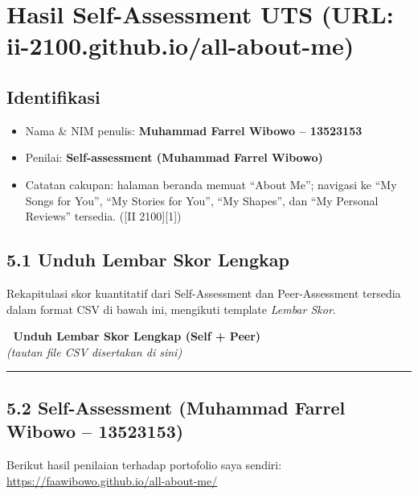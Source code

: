 \documentclass[
  letterpaper,
  DIV=11,
  numbers=noendperiod]{scrreprt}
\providecommand{\tightlist}{%
  \setlength{\itemsep}{0pt}\setlength{\parskip}{0pt}}
\begin{document}

\chapter{Hasil Self-Assessment UTS (URL:
ii-2100.github.io/all-about-me)}\label{hasil-self-assessment-uts-url-ii-2100.github.ioall-about-me}

\section{Identifikasi}\label{identifikasi}

\begin{itemize}
\tightlist
\item
  Nama \& NIM penulis: \textbf{Muhammad Farrel Wibowo -- 13523153}
\item
  Penilai: \textbf{Self-assessment (Muhammad Farrel Wibowo)}
\item
  Catatan cakupan: halaman beranda memuat ``About Me''; navigasi ke ``My
  Songs for You'', ``My Stories for You'', ``My Shapes'', dan ``My
  Personal Reviews'' tersedia. ({[}II 2100{]}{[}1{]})
\end{itemize}

\section{5.1 Unduh Lembar Skor Lengkap}\label{unduh-lembar-skor-lengkap}

Rekapitulasi skor kuantitatif dari Self-Assessment dan Peer-Assessment
tersedia dalam format CSV di bawah ini, mengikuti template \emph{Lembar
Skor}.

📎 \textbf{Unduh Lembar Skor Lengkap (Self + Peer)}\\
\emph{(tautan file CSV disertakan di sini)}

\begin{center}\rule{0.5\linewidth}{0.5pt}\end{center}

\section{5.2 Self-Assessment (Muhammad Farrel Wibowo --
13523153)}\label{self-assessment-muhammad-farrel-wibowo-13523153}

Berikut hasil penilaian terhadap portofolio saya sendiri:\\
\url{https://faawibowo.github.io/all-about-me/}
\end{document}
